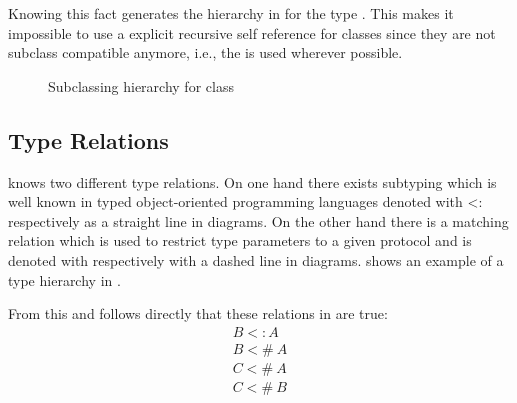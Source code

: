 Knowing this fact generates the hierarchy in
 for the type \C. This makes it impossible
to use a explicit recursive self reference for classes since they are not
subclass compatible anymore, i.e., the \mytype is used wherever possible.

\begin{figure}[ht]
	\centering
	\caption{Subclassing hierarchy for class \C}
	\label{fig:fixedHierarchy}
\end{figure}
%

\subsection{Type Relations}
\ooplss knows two different type relations. On one hand there exists
subtyping which is well known in typed object-oriented programming
languages denoted with <: respectively as a straight line in diagrams. On
the other hand there is a matching relation which is used to restrict type
parameters to a given protocol and is denoted with \match respectively
with a dashed line in diagrams.  shows an example
of a type hierarchy in \ooplss.

From this and  follows directly that these
relations in  are true:
\begin{align}
B <: A \\
B <\!\!\#~A \label{alg:match} \\
C <\!\!\#~A \\
C <\!\!\#~B
\end{align}



